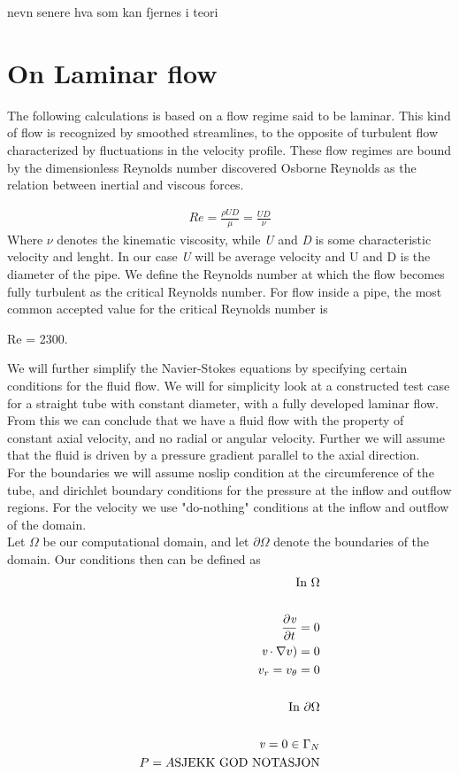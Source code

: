 \documentclass[a4paper,norsk]{article}
\begin{document}
nevn senere hva som kan fjernes i teori




\section*{On Laminar flow}
The following calculations is based on a flow regime said to be laminar. This kind of flow is recognized by smoothed streamlines, to the
opposite of turbulent flow characterized by fluctuations in the velocity profile. These flow regimes are bound by the dimensionless
Reynolds number discovered Osborne Reynolds as the relation between inertial and viscous forces.

\begin{align}
Re = \frac{\rho U D}{\mu} = \frac{UD}{\nu}
\end{align}
Where $\nu$ denotes the kinematic viscosity, while \textit{U} and \textit{D} is some characteristic velocity and lenght. In our case \textit{U} will be
average velocity and U and D is the diameter of the pipe. We define the Reynolds number at which the flow becomes fully turbulent as
the critical Reynolds number. For flow inside a pipe, the most common accepted value for the critical Reynolds number is

Re = 2300.

We will further simplify the Navier-Stokes equations by specifying certain conditions for the fluid flow.
We will for simplicity look at a constructed test case for a straight tube with constant diameter, with a
fully developed laminar flow. From this we can conclude that we have a fluid flow with the property of constant axial velocity, and no radial
or angular velocity. Further we will assume that the fluid is driven by a pressure gradient parallel to the axial direction. \\
For the boundaries we will assume noslip condition at the circumference of the tube, and dirichlet boundary conditions for the pressure
at the inflow and outflow regions. For the velocity we use "do-nothing" conditions at the inflow and outflow of the domain.\\

Let $\Omega$ be our computational domain, and let $\partial \Omega$ denote the boundaries of the domain.
Our conditions then can be defined as
\begin{align}
\text{In } \Omega \\ \\
\frac{\partial \textit{v}}{\partial t} = 0 \\
\textit{v} \cdot \nabla v ) = 0 \\
v_r = v_\theta = 0 \\ \\
\text{In } \partial \Omega \\ \\
\text{\textit{v}} = 0 \in \Gamma_N \\
P = A \text{SJEKK GOD NOTASJON}
\end{align}
\end{document}
